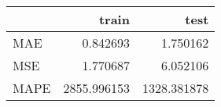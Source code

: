\begin{tabular}{lrr}
\toprule
{} &        train &         test \\
\midrule
MAE  &     0.842693 &     1.750162 \\
MSE  &     1.770687 &     6.052106 \\
MAPE &  2855.996153 &  1328.381878 \\
\bottomrule
\end{tabular}
